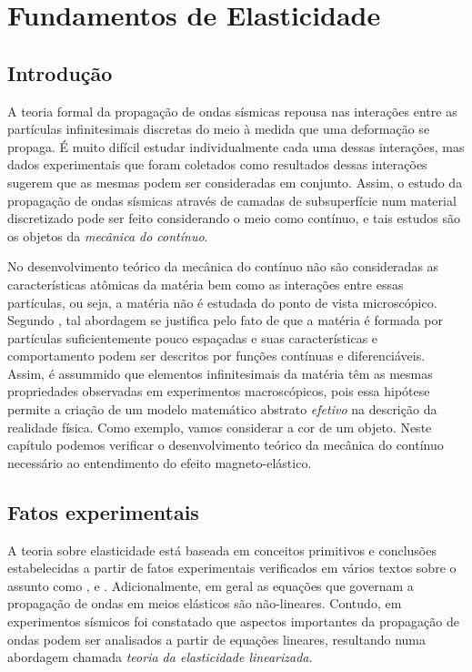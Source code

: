 \chapter{Fundamentos de Elasticidade}\label{sec.fund_elast}

\section{Introdu\c{c}\~ao}
A teoria formal da propaga\c{c}\~ao de ondas s\'ismicas repousa nas intera\c{c}\~oes entre as part\'iculas infinitesimais discretas do meio \`a medida que uma deforma\c{c}\~ao se propaga. \'E muito dif\'icil estudar individualmente cada uma dessas intera\c{c}\~oes, mas dados experimentais que foram coletados como resultados dessas intera\c{c}\~oes sugerem que as mesmas podem ser consideradas em conjunto. Assim, o estudo da propaga\c{c}\~ao de ondas s\'ismicas atrav\'es de camadas de subsuperf\'icie num material discretizado pode ser feito considerando o meio como cont\'inuo, e tais estudos s\~ao os objetos da \textit{mec\^anica do cont\'inuo}. 

No desenvolvimento te\'orico da mec\^anica do cont\'inuo n\~ao s\~ao consideradas as caracter\'isticas at\^omicas da mat\'eria bem como as intera\c{c}\~oes entre essas part\'iculas, ou seja, a mat\'eria n\~ao \'e estudada do ponto de vista microsc\'opico. Segundo \cite{slawinski}, tal abordagem se justifica pelo fato de que a mat\'eria \'e formada por part\'iculas suficientemente pouco espa\c{c}adas e suas caracter\'isticas e comportamento podem ser descritos por fun\c{c}\~oes cont\'inuas e diferenci\'aveis. Assim, \'e assummido que elementos infinitesimais da mat\'eria t\^em as mesmas propriedades observadas em experimentos macrosc\'opicos, pois essa hip\'otese permite a cria\c{c}\~ao de um modelo matem\'atico abstrato \textit{efetivo} na descri\c{c}\~ao da realidade f\'isica. Como exemplo, vamos considerar a cor de um objeto. 
Neste cap\'itulo podemos verificar o desenvolvimento te\'orico da mec\^anica do cont\'inuo necess\'ario ao entendimento do efeito magneto-el\'astico.

\section{Fatos experimentais}
A teoria sobre elasticidade est\'a baseada em conceitos primitivos e conclus\~oes estabelecidas a partir de fatos experimentais verificados em v\'arios textos sobre o assunto como \cite{liu}, \cite{dahlem} e \cite{slawinski}. Adicionalmente, em geral as equa\c{c}\~oes que governam a propaga\c{c}\~ao de ondas em meios el\'asticos s\~ao n\~ao-lineares. Contudo, em experimentos s\'ismicos foi constatado que aspectos importantes da propaga\c{c}\~ao de ondas podem ser analisados a partir de equa\c{c}\~oes lineares, resultando numa abordagem chamada \textit{teoria da elasticidade linearizada}.

